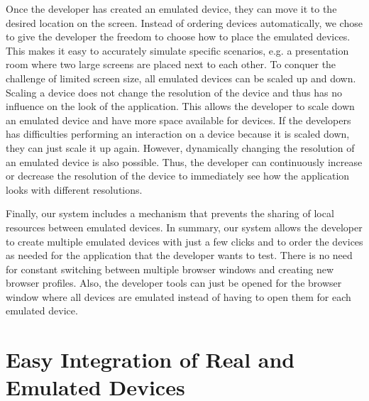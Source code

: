 Once the developer has created an emulated device, they can move it to the desired location on the screen. Instead of ordering devices automatically, we chose to give the developer the freedom to choose how to place the emulated devices. This makes it easy to accurately simulate specific scenarios, e.g. a presentation room where two large screens are placed next to each other. To conquer the challenge of limited screen size, all emulated devices can be scaled up and down. Scaling a device does not change the resolution of the device and thus has no influence on the look of the application. This allows the developer to scale down an emulated device and have more space available for devices. If the developers has difficulties performing an interaction on a device because it is scaled down, they can just scale it up again. However, dynamically changing the resolution of an emulated device is also possible. Thus, the developer can continuously increase or decrease the resolution of the device to immediately see how the application looks with different resolutions. 

Finally, our system includes a mechanism that prevents the sharing of local resources between emulated devices. In summary, our system allows the developer to create multiple emulated devices with just a few clicks and to order the devices as needed for the application that the developer wants to test. There is no need for constant switching between multiple browser windows and creating new browser profiles. Also, the developer tools can just be opened for the browser window where all devices are emulated instead of having to open them for each emulated device.
 
\section{Easy Integration of Real and Emulated Devices}

